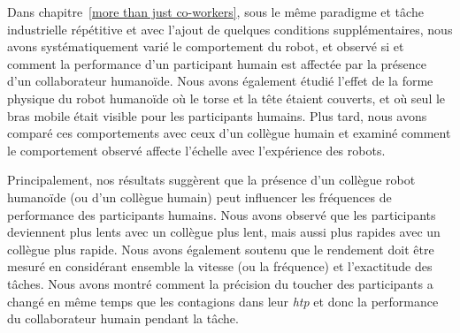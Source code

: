 Dans chapitre~\ref{more than just co-workers}, sous le même paradigme et tâche industrielle répétitive et avec l'ajout de quelques conditions supplémentaires, nous avons systématiquement varié le comportement du robot, et observé si et comment la performance d'un participant humain est affectée par la présence d'un collaborateur humanoïde. Nous avons également étudié l'effet de la forme physique du robot humanoïde où le torse et la tête étaient couverts, et où seul le bras mobile était visible pour les participants humains. Plus tard, nous avons comparé ces comportements avec ceux d'un collègue humain et examiné comment le comportement observé affecte l'échelle avec l'expérience des robots. 





 
Principalement, nos résultats suggèrent que la présence d'un collègue robot humanoïde (ou d'un collègue humain) peut influencer les fréquences de performance des participants humains. Nous avons observé que les participants deviennent plus lents avec un collègue plus lent, mais aussi plus rapides avec un collègue plus rapide. Nous avons également soutenu que le rendement doit être mesuré en considérant ensemble la vitesse (ou la fréquence) et l'exactitude des tâches. Nous avons montré comment la précision du toucher des participants a changé en même temps que les contagions dans leur {\it htp} et donc la performance du collaborateur humain pendant la tâche.





